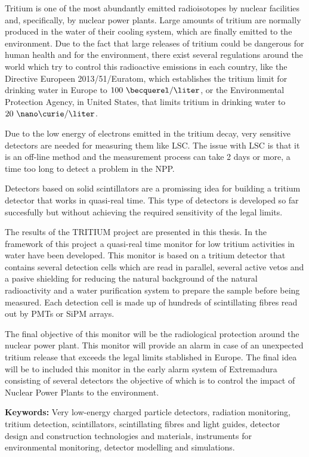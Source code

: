 Tritium is one of the most abundantly emitted radioisotopes by nuclear facilities and, specifically, by nuclear power plants. Large amounts of tritium are normally produced in the water of their cooling system, which are finally emitted to the environment. Due to the fact that large releases of tritium could be dangerous for human health and for the environment, there exist several regulations around the world which try to control this radioactive emissions in each country, like the Directive Europeen 2013/51/Euratom, which establishes the tritium limit for drinking water in Europe to $100~\becquerel/\liter$, or the Environmental Protection Agency, in United States, that limits tritium in drinking water to $20~\nano\curie/\liter$.

Due to the low energy of electrons emitted in the tritium decay, very sensitive detectors are needed for measuring them like LSC. The issue with LSC is that it is an off-line method and the measurement process can take 2 days or more, a time too long to detect a problem in the NPP.

Detectors based on solid scintillators are a promissing idea for building a tritium detector that works in quasi-real time. This type of detectors is developed so far succesfully but without achieving the required sensitivity of the legal limits.

The results of the TRITIUM project are presented in this thesis. In the framework of this project a quasi-real time monitor for low tritium activities in water have been developed. This monitor is based on a tritium detector that contains several detection cells which are read in parallel, several active vetos and a pasive shielding for reducing the natural background of the natural radioactivity and a water purification system to prepare the sample before being measured. Each detection cell is made up of hundreds of scintillating fibres read out by PMTs or SiPM arrays.

The final objective of this monitor will be the radiological protection around the nuclear power plant. This monitor will provide an alarm in case of an unexpected tritium release that exceeds the legal limits stablished in Europe. The final idea will be to included this monitor in the early alarm system of Extremadura consisting of several detectors the objective of which is to control the impact of Nuclear Power Plants to the environment.

\vspace{1cm}

\textbf{Keywords:} Very low-energy charged particle detectors, radiation monitoring, tritium detection, scintillators, scintillating fibres and light guides, detector design and construction technologies and materials, instruments for environmental monitoring, detector modelling and simulations.

